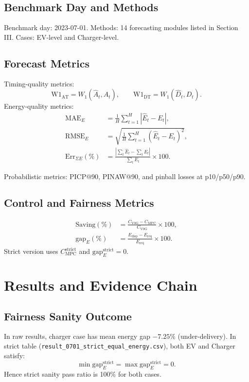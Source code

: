 \documentclass[journal]{IEEEtran}
\newcommand{\AT}{\mathrm{AT}}
\newcommand{\DT}{\mathrm{DT}}
\newcommand{\Wone}{\mathrm{W1}}
\newcommand{\RMSE}{\mathrm{RMSE}}
\newcommand{\MAE}{\mathrm{MAE}}
\begin{document}
\subsection{Benchmark Day and Methods}
Benchmark day: 2023-07-01.
Methods: 14 forecasting modules listed in Section III.
Cases: EV-level and Charger-level.

\subsection{Forecast Metrics}
Timing-quality metrics:
\begin{equation}
\Wone_{\AT}=W_1(\hat{A}_t,A_t),\qquad \Wone_{\DT}=W_1(\hat{D}_t,D_t).
\end{equation}
Energy-quality metrics:
\begin{align}
\MAE_E &= \frac{1}{H}\sum_{t=1}^{H}|\hat{E}_t-E_t|,\\
\RMSE_E &= \sqrt{\frac{1}{H}\sum_{t=1}^{H}(\hat{E}_t-E_t)^2},\\
\mathrm{Err}_{\Sigma E}(\%) &= \frac{|\sum_t\hat{E}_t-\sum_tE_t|}{\sum_tE_t}\times 100.
\end{align}

Probabilistic metrics: PICP@90, PINAW@90, and pinball losses at p10/p50/p90.

\subsection{Control and Fairness Metrics}
\begin{align}
\mathrm{Saving}(\%) &= \frac{C_{\mathrm{V0G}}-C_{\mathrm{MPC}}}{C_{\mathrm{V0G}}}\times 100,\\
\mathrm{gap}_E(\%) &= \frac{E_{\mathrm{disp}}-E_{\mathrm{req}}}{E_{\mathrm{req}}}\times 100.
\end{align}
Strict version uses $C_{\mathrm{MPC}}^{\mathrm{strict}}$ and $\mathrm{gap}_E^{\mathrm{strict}}=0$.

\section{Results and Evidence Chain}

\subsection{Fairness Sanity Outcome}
In raw results, charger case has mean energy gap $-7.25\%$ (under-delivery). In strict table (\texttt{result\_0701\_strict\_equal\_energy.csv}), both EV and Charger satisfy:
\begin{equation}
\min \mathrm{gap}_E^{\mathrm{strict}} = \max \mathrm{gap}_E^{\mathrm{strict}} = 0.
\end{equation}
Hence strict sanity pass ratio is 100\% for both cases.
\end{document}
